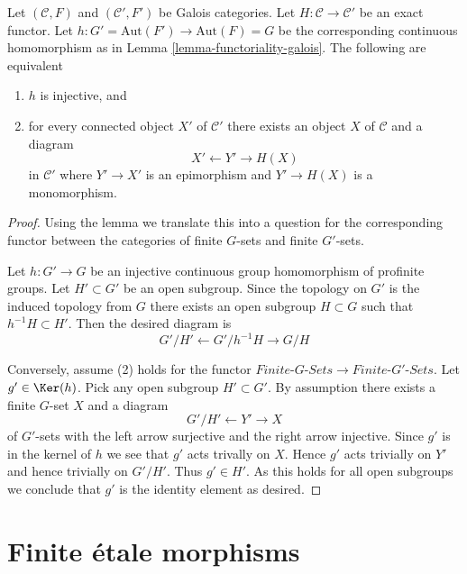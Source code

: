 \begin{lemma}
\label{lemma-functoriality-galois-injective}
Let $(\mathcal{C}, F)$ and $(\mathcal{C}', F')$ be Galois categories.
Let $H : \mathcal{C} \to \mathcal{C}'$ be an exact functor.
Let $h : G' = \text{Aut}(F') \to \text{Aut}(F) = G$ be the corresponding
continuous homomorphism as in Lemma \ref{lemma-functoriality-galois}.
The following are equivalent
\begin{enumerate}
\item $h$ is injective, and
\item for every connected object $X'$ of $\mathcal{C}'$
there exists an object $X$ of $\mathcal{C}$ and a diagram
$$
X' \leftarrow Y' \rightarrow H(X)
$$
in $\mathcal{C}'$ where $Y' \to X'$ is an epimorphism and
$Y' \to H(X)$ is a monomorphism.
\end{enumerate}
\end{lemma}

\begin{proof}
Using the lemma we translate this into a question for the corresponding
functor between the categories of finite $G$-sets and finite $G'$-sets.

\medskip\noindent
Let $h : G' \to G$ be an injective continuous group homomorphism
of profinite groups. Let $H' \subset G'$ be an open subgroup.
Since the topology on $G'$ is the induced topology from $G$
there exists an open subgroup $H \subset G$ such that $h^{-1}H \subset H'$.
Then the desired diagram is
$$
G'/H' \leftarrow G'/h^{-1}H \rightarrow G/H
$$

\medskip\noindent
Conversely, assume (2) holds for the functor
$\textit{Finite-}G\textit{-Sets} \to \textit{Finite-}G'\textit{-Sets}$.
Let $g' \in \Ker(h)$. Pick any open subgroup $H' \subset G'$.
By assumption there exists a finite $G$-set $X$ and a diagram
$$
G'/H' \leftarrow Y' \rightarrow X
$$
of $G'$-sets with the left arrow surjective and the right arrow injective.
Since $g'$ is in the kernel of $h$ we see that $g'$ acts trivally on $X$.
Hence $g'$ acts trivially on $Y'$ and hence trivially on $G'/H'$.
Thus $g' \in H'$. As this holds for all open subgroups we conclude
that $g'$ is the identity element as desired.
\end{proof}






\section{Finite \'etale morphisms}
\label{section-finite-etale}

